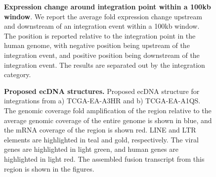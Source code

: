\documentclass[12pt]{article}
\begin{document}
\begin{figure}[htpb]
  \centering
\caption[Fusion reads supp.]
{\label{updown_100kb}  {\bf Expression change around integration point within a 100kb window}.  We report the average fold expression change upstream and downstream of an integration event within a 100kb window.  The position is reported relative to the integration point in the human genome, with negative position being upstream of the integration event, and positive position being downstream of the integration event.  The results are separated out by the integration category. } %
\end{figure}

\begin{figure}[htpb]
  \centering
\caption[Proposed ecDNA structures.]
{\label{ecDNA_supp}  {\bf Proposed ecDNA structures.}  Proposed ecDNA structure for integrations from a) TCGA-EA-A3HR and b) TCGA-EA-A1QS.  The genomic coverage fold amplification of the region relative to the average genomic coverage of the entire genome is shown in blue, and the mRNA coverage of the region is shown red.  LINE and LTR elements are highlighted in teal and gold, respectively.  The viral genes are highlighted in light green, and human genes are highlighted in light red.  The assembled fusion transcript from this region is shown in the figures.  }
\end{figure}
\clearpage

\def\bibfont{\normalsize}

\end{document}
